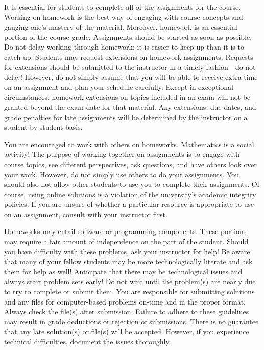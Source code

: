 \documentclass[11pt,letterpaper]{article}
\begin{document}
It is essential for students to complete all of the assignments for the course. Working on homework is the best way of engaging with course concepts and gauging one's mastery of the material. Moreover, homework is an essential portion of the course grade. Assignments should be started as soon as possible. Do not delay working through homework; it is easier to keep up than it is to catch up. Students may request extensions on homework assignments. Requests for extensions should be submitted to the instructor in a timely fashion---do not delay! However, do not simply assume that you will be able to receive extra time on an assignment and plan your schedule carefully. Except in exceptional circumstances, homework extensions on topics included in an exam will not be granted beyond the exam date for that material. Any extensions, due dates, and grade penalties for late assignments will be determined by the instructor on a student-by-student basis. \pspace

You are encouraged to work with others on homeworks. Mathematics is a social activity! The purpose of working together on assignments is to engage with course topics, see different perspectives, ask questions, and have others look over your work. However, do not simply use others to do your assignments. You should also not allow other students to use you to complete their assignments. Of course, using online solutions is a violation of the university's academic integrity policies. If you are unsure of whether a particular resource is appropriate to use on an assignment, consult with your instructor first. \pspace

Homeworks may entail software or programming components. These portions may require a fair amount of independence on the part of the student. Should you have difficulty with these problems, ask your instructor for help! Be aware that many of your fellow students may be more technologically literate and ask them for help as well! Anticipate that there may be technological issues and always start problem sets early! Do not wait until the problem(s) are nearly due to try to complete or submit them. You are responsible for submitting solutions and any files for computer-based problems on-time and in the proper format. Always check the file(s) after submission. Failure to adhere to these guidelines may result in grade deductions or rejection of submissions. There is no guarantee that any late solution(s) or file(s) will be accepted. However, if you experience technical difficulties, document the issues thoroughly. 
\sectionbreak
\end{document}
